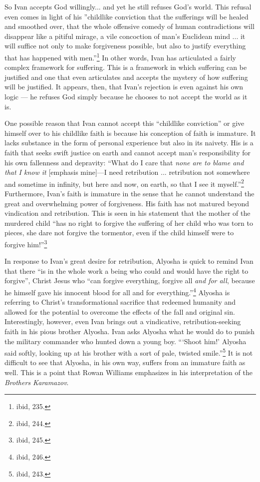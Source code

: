 	So Ivan accepts God willingly... and yet he still refuses God's world. This refusal even comes in light of his ''childlike conviction that the sufferings will be healed and smoothed over, that the whole offensive comedy of human contradictions will disappear like a pitiful mirage, a vile concoction of man's Euclidean mind ... it will suffice not only to make forgiveness possible, but also to justify everything that has happened with men.''\footnote{ibid, 235.} In other words, Ivan has articulated a fairly complex framework for suffering. This is a framework in which suffering can be justified and one that even articulates and accepts the mystery of how suffering will be justified. It appears, then, that Ivan's rejection is even against his own logic --- he refuses God simply because he chooses to not accept the world as it is.
	
	One possible reason that Ivan cannot accept this ``childlike conviction'' or give himself over to his childlike faith is because his conception of faith is immature. It lacks substance in the form of personal experience but also in its naivety. His is a faith that seeks swift justice on earth and cannot accept man's responsibility for his own fallenness and depravity: ``What do I care that \emph{none are to blame and that I know it} [emphasis mine]---I need retribution ... retribution not somewhere and sometime in infinity, but here and now, on earth, so that I see it myself.''\footnote{ibid, 244.} Furthermore, Ivan's faith is immature in the sense that he cannot understand the great and overwhelming power of forgiveness. His faith has not matured beyond vindication and retribution. This is seen in his statement that the mother of the murdered child ``has no right to forgive the suffering of her child who was torn to pieces, she dare not forgive the tormentor, even if the child himself were to forgive him!''\footnote{ibid, 245.}
	
	In response to Ivan's great desire for retribution, Alyosha is quick to remind Ivan that there ``is in the whole work a being who could and would have the right to forgive'', Christ Jesus who ``can forgive everything, forgive all \emph{and for all}, because he himself gave his innocent blood for all and for everything.''\footnote{ibid, 246.} Alyosha is referring to Christ's transformational sacrifice that redeemed humanity and allowed for the potential to overcome the effects of the fall and original sin. Interestingly, however, even Ivan brings out a vindicative, retribution-seeking faith in his pious brother Alyosha. Ivan asks Alyosha what he would do to punish the military commander who hunted down a young boy. ```Shoot him!' Alyosha said softly, looking up at his brother with a sort of pale, twisted smile.''\footnote{ibid, 243.} It is not difficult to see that Alyosha, in his own way, suffers from an immature faith as well. This is a point that Rowan Williams emphasizes in his interpretation of the \emph{Brothers Karamazov}.
	
